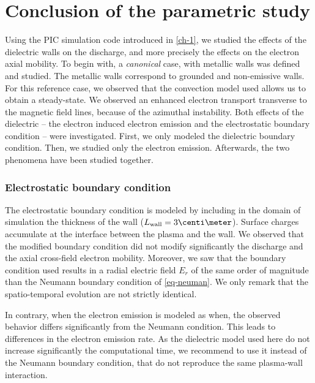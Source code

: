 
\section{Conclusion of the parametric study}
  \label{sec-conclusion_ch2}
  
  Using the \ac{PIC} simulation code introduced in \cref{ch-1}, we studied the effects of the dielectric walls on the discharge, and more precisely the effects on the electron axial mobility.
  To begin with, a \emph{canonical} case, with metallic walls was defined and studied.
  The metallic walls correspond to grounded and non-emissive walls.
  For this reference case, we observed that the convection model used allows us to obtain a steady-state.
  We observed an enhanced electron transport transverse to the magnetic field lines, because of the azimuthal instability.
  Both effects of the dielectric -- the electron induced electron emission and the electrostatic boundary condition -- were investigated.
  First, we  only modeled the dielectric boundary condition. Then, we studied only the electron emission. Afterwards, the two phenomena have been studied together.
  
  \subsubsection*{Electrostatic boundary condition}
  
  The electrostatic boundary condition is modeled by including in the domain of simulation the thickness of the wall ($L_{\rm wall} = 3 \centi\meter$).
  Surface charges accumulate at the interface between the plasma and the wall.
  We observed that the modified boundary condition did not modify significantly the discharge and the axial cross-field electron mobility.
  Moreover, we saw that the boundary condition used results in a radial electric field $E_r$ of the same order of magnitude than the Neumann boundary condition of \cref{eq-neuman}.
  We only remark that the spatio-temporal evolution are not strictly identical.
  
  In contrary, when the electron emission is modeled as when, the observed behavior differs significantly from the Neumann condition.
  This leads to differences in the electron emission rate.
  As the dielectric model used here do not increase significantly the computational time, we recommend to use it instead of the Neumann boundary condition, that do not reproduce the same plasma-wall interaction.
  
